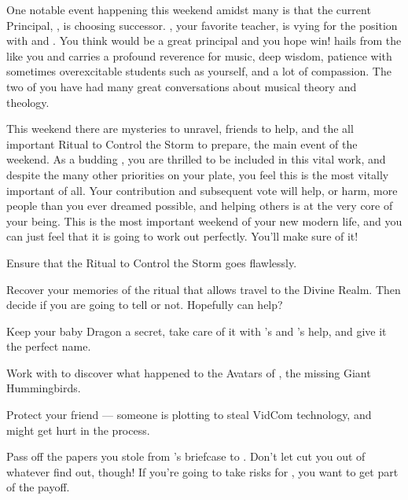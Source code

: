\documentclass[char]{GL2020}
\begin{document}
One notable event happening this weekend amidst many is that the current Principal, \cPrincipal{\full}, is choosing \cPrincipal{\their} successor. \cMusic{\full}, your favorite teacher, is vying for the position with \cBeetle{\full} and \cChupSecond{\full}. You think \cMusic{} would be a great principal and you hope \cMusic{\they} win\cMusic{\verbs}! \cMusic{} hails from the \pFarm{} like you and carries a profound reverence for music, deep wisdom, patience with sometimes overexcitable students such as yourself, and a lot of compassion. The two of you have had many great conversations about musical theory and theology.

This weekend there are mysteries to unravel, friends to help, and the all important Ritual to Control the Storm to prepare, the main event of the weekend. As a budding \cDisney{\cleric}, you are thrilled to be included in this vital work, and despite the many other priorities on your plate, you feel this is the most vitally important of all. Your contribution and subsequent vote will help, or harm, more people than you ever dreamed possible, and helping others is at the very core of your being. This is the most important weekend of your new modern life, and you can just feel that it is going to work out perfectly. You'll make sure of it!

\begin{itemz}
    \item Ensure that the Ritual to Control the Storm goes flawlessly.
    \item Recover your memories of the ritual that allows travel to the Divine Realm. Then decide if you are going to tell \cWildCard{} or not. Hopefully \cTechStar{} can help?
    \item Keep your baby Dragon a secret, take care of it with \cPirateChild{}'s and \cAdopted{}'s help, and give it the perfect name.
    \item Work with \cJuniorStatesman{} to discover what happened to the Avatars of \cFarmGod{}, the missing Giant Hummingbirds.
    \item Protect your friend \cTechStar{} — someone is plotting to steal \cTechStar{\their} VidCom technology, and \cTechStar{} might get hurt in the process.
    \item Pass off the papers you stole from \cBunker{}'s briefcase to \cWildCard{}. Don't let \cWildCard{\them} cut you out of whatever \cWildCard{\they} find\cWildCard{\verbs} out, though! If you're going to take risks for \cWildCard{\them}, you want to get part of the payoff.
\end{itemz}
\end{document}
